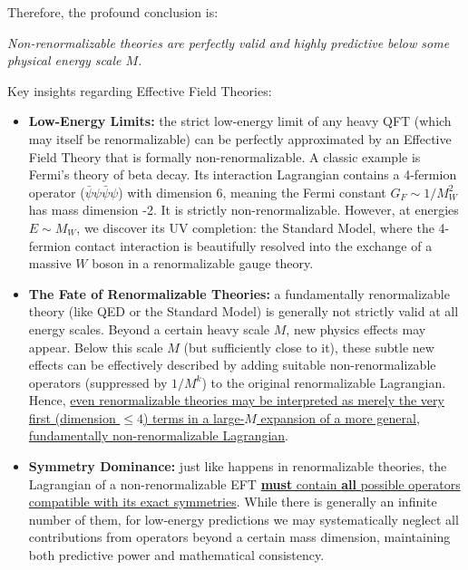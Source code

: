 Therefore, the profound conclusion is:
\begin{center}
    \textit{Non-renormalizable theories are perfectly valid and highly predictive below some physical energy scale $M$.}
\end{center}

Key insights regarding Effective Field Theories:
\begin{itemize}
    \item \textbf{Low-Energy Limits:} the strict low-energy limit of any heavy QFT (which may itself be renormalizable) can be perfectly approximated by an Effective Field Theory that is formally non-renormalizable. A classic example is Fermi's theory of beta decay. Its interaction Lagrangian contains a 4-fermion operator ($\bar{\psi}\psi\bar{\psi}\psi$) with dimension 6, meaning the Fermi constant $G_F \sim 1/M_W^2$ has mass dimension -2. It is strictly non-renormalizable. However, at energies $E \sim M_W$, we discover its UV completion: the Standard Model, where the 4-fermion contact interaction is beautifully resolved into the exchange of a massive $W$ boson in a renormalizable gauge theory.
    \item \textbf{The Fate of Renormalizable Theories:} a fundamentally renormalizable theory (like QED or the Standard Model) is generally not strictly valid at all energy scales. Beyond a certain heavy scale $M$, new physics effects may appear. Below this scale $M$ (but sufficiently close to it), these subtle new effects can be effectively described by adding suitable non-renormalizable operators (suppressed by $1/M^k$) to the original renormalizable Lagrangian. Hence, \uline{even renormalizable theories may be interpreted as merely the very first (dimension $\leq 4$) terms in a large-$M$ expansion of a more general, fundamentally non-renormalizable Lagrangian}.
    \item \textbf{Symmetry Dominance:} just like happens in renormalizable theories, the Lagrangian of a non-renormalizable EFT \uline{\textbf{must} contain \textbf{all} possible operators compatible with its exact symmetries}. While there is generally an infinite number of them, for low-energy predictions we may systematically neglect all contributions from operators beyond a certain mass dimension, maintaining both predictive power and mathematical consistency.
\end{itemize}